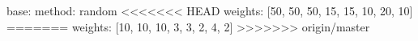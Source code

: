 base:
  method: random
<<<<<<< HEAD
  weights: [50, 50, 50, 15, 15, 10, 20, 10]
=======
  weights: [10, 10, 10, 3, 3, 2, 4, 2]
>>>>>>> origin/master
